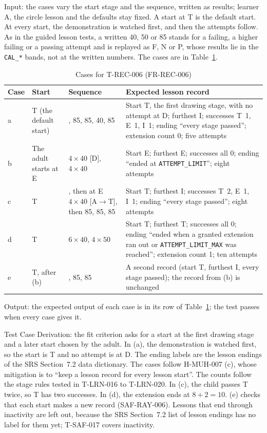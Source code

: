 \documentclass[12pt, titlepage]{article}
\begin{document}
\begin{enumerate}
Input: the cases vary the start stage and the sequence, written as results;
learner A, the circle lesson and the defaults stay fixed. A start at T is
the default start. At every start, the demonstration is watched first, and
then the attempts follow. As in the guided lesson tests, a written 40, 50
or 85 stands for a
failing, a higher failing or a passing attempt and is replayed as F, N or P,
whose results lie in the \texttt{CAL\_*} bands, not at the written numbers.
The cases are in Table~\ref{tab:t-rec-006}.

\begin{table}[htbp]
\centering\small
\caption{Cases for T-REC-006 (FR-REC-006)}
\label{tab:t-rec-006}
\begin{tabularx}{\textwidth}{@{}l >{\raggedright\arraybackslash}p{2cm}
  >{\raggedright\arraybackslash}X >{\raggedright\arraybackslash}X@{}}
\toprule
\textbf{Case} & \textbf{Start} & \textbf{Sequence} &
\textbf{Expected lesson record}\\
\midrule
a & T (the default start) & 40, 85, 85, 40, 85 & Start T, the first drawing
stage, with no attempt at D; furthest I; successes T~1, E~1, I~1; ending
``every stage passed''; extension count 0; five attempts\\
b & The adult starts at E & $4 \times 40$ [D], $4 \times 40$ & Start E;
furthest E; successes all 0; ending ``ended at
\texttt{ATTEMPT\_LIMIT}''; eight attempts\\
c & T & 85, then at E $4 \times 40$ [A$\to$T], then 85, 85, 85 & Start T;
furthest I; successes T~2, E~1, I~1; ending ``every stage passed''; eight
attempts\\
d & T & $6 \times 40$, $4 \times 50$ & Start T; furthest T; successes all
0; ending ``ended when a granted extension ran out or
\texttt{ATTEMPT\_LIMIT\_MAX} was reached''; extension count 1; ten
attempts\\
e & T, after (b) & 85, 85, 85 & A second record (start T, furthest I,
every stage passed); the record from (b) is unchanged\\
\bottomrule
\end{tabularx}
\end{table}

Output: the expected output of each case is in its row of
Table~\ref{tab:t-rec-006}; the test passes when every case gives it.

Test Case Derivation: the fit criterion asks for a start at the first
drawing stage and a later start chosen by the adult. In (a), the
demonstration is watched first, so the start is T and no attempt is at D.
The ending labels are the lesson endings of the SRS Section~7.2 data
dictionary. The cases follow H-MUH-007 (c), whose mitigation is to ``keep a
lesson record for every lesson start''. The counts
follow the stage rules tested in T-LRN-016 to T-LRN-020. In (c), the child
passes T twice, so T has two successes. In (d), the extension ends at
$8 + 2 = 10$. (e) checks that each start makes a new record (SAF-RAY-006).
Lessons that end through inactivity are left out, because the SRS
Section~7.2 list of lesson endings has no label for them yet; T-SAF-017
covers inactivity.


\end{enumerate}
\end{document}
